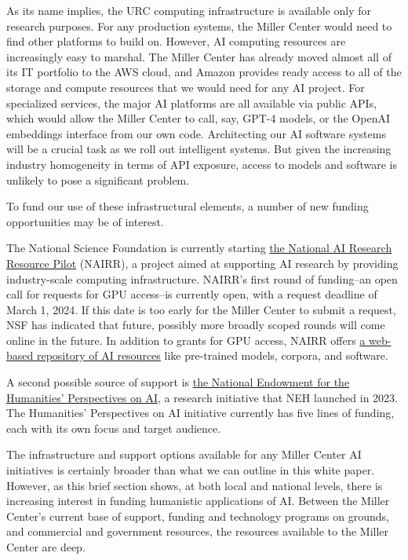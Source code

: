\documentclass[12pt, oneside]{article}   	%
\begin{document}
As its name implies, the URC computing infrastructure is available only for research purposes.  For any production systems, the Miller Center would need to find other platforms to build on.  However, AI computing resources are increasingly easy to marshal.  The Miller Center has already moved almost all of its IT portfolio to the AWS cloud, and Amazon provides ready access to all of the storage and compute resources that we would need for any AI project.  For specialized services, the major AI platforms are all available via public APIs, which would allow the Miller Center to call, say, GPT-4 models, or the OpenAI embeddings interface from our own code.  Architecting our AI software systems will be a crucial task as we roll out intelligent systems.  But given the increasing industry homogeneity in terms of API exposure, access to models and software is unlikely to pose a significant problem.

To fund our use of these infrastructural elements, a number of new funding opportunities may be of interest.  

The National Science Foundation is currently starting \href{https://nairrpilot.org}{the National AI Research Resource Pilot} (NAIRR),  a project aimed at supporting AI research by providing industry-scale computing infrastructure.  NAIRR's first round of funding--an open call for requests for GPU access--is currently open, with a request deadline of March 1, 2024.  If this date is too early for the Miller Center to submit a request, NSF has indicated that future, possibly more broadly scoped rounds will come online in the future.  In addition to grants for GPU access, NAIRR offers \href{https://nairrpilot.org/pilot-resources}{a web-based repository of AI resources} like pre-trained models, corpora, and software.  

A second possible source of support is \href{https://www.neh.gov/AI}{the National Endowment for the Humanities' Perspectives on AI}, a research initiative that NEH launched in 2023. The Humanities' Perspectives on AI initiative currently has five lines of funding, each with its own focus and target audience.  

The infrastructure and support options available for any Miller Center AI initiatives is certainly broader than what we can outline in this white paper.  However, as this brief section shows, at both local and national levels, there is increasing interest in funding humanistic applications of AI.  Between the Miller Center's current base of support, funding and technology programs on grounds, and commercial and government resources, the resources available to the Miller Center are deep.
 
\end{document}
